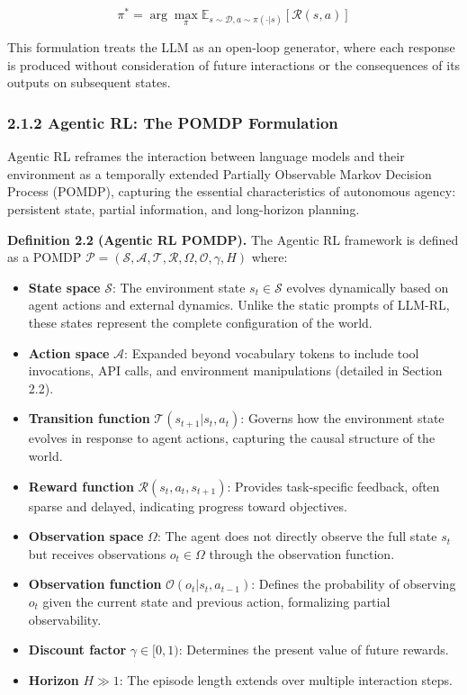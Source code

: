 $$\pi^* = \arg\max_{\pi} \mathbb{E}_{s \sim \mathcal{D}, a \sim \pi(\cdot|s)}[\mathcal{R}(s, a)]$$

This formulation treats the LLM as an open-loop generator, where each response is produced without consideration of future interactions or the consequences of its outputs on subsequent states.

\subsubsection{2.1.2 Agentic RL: The POMDP Formulation}

Agentic RL reframes the interaction between language models and their environment as a temporally extended Partially Observable Markov Decision Process (POMDP), capturing the essential characteristics of autonomous agency: persistent state, partial information, and long-horizon planning.

\textbf{Definition 2.2 (Agentic RL POMDP).} The Agentic RL framework is defined as a POMDP $\mathcal{P} = (\mathcal{S}, \mathcal{A}, \mathcal{T}, \mathcal{R}, \Omega, \mathcal{O}, \gamma, H)$ where:

\begin{itemize}
    \item \textbf{State space} $\mathcal{S}$: The environment state $s_t \in \mathcal{S}$ evolves dynamically based on agent actions and external dynamics. Unlike the static prompts of LLM-RL, these states represent the complete configuration of the world.

    \item \textbf{Action space} $\mathcal{A}$: Expanded beyond vocabulary tokens to include tool invocations, API calls, and environment manipulations (detailed in Section 2.2).

    \item \textbf{Transition function} $\mathcal{T}(s_{t+1} | s_t, a_t)$: Governs how the environment state evolves in response to agent actions, capturing the causal structure of the world.

    \item \textbf{Reward function} $\mathcal{R}(s_t, a_t, s_{t+1})$: Provides task-specific feedback, often sparse and delayed, indicating progress toward objectives.

    \item \textbf{Observation space} $\Omega$: The agent does not directly observe the full state $s_t$ but receives observations $o_t \in \Omega$ through the observation function.

    \item \textbf{Observation function} $\mathcal{O}(o_t | s_t, a_{t-1})$: Defines the probability of observing $o_t$ given the current state and previous action, formalizing partial observability.

    \item \textbf{Discount factor} $\gamma \in [0, 1)$: Determines the present value of future rewards.

    \item \textbf{Horizon} $H \gg 1$: The episode length extends over multiple interaction steps.

\end{itemize}
